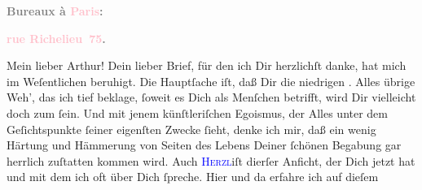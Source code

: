            \pstart
           \begin{otherlanguage}{french}\textcolor{gray}{\textbf{\textbf{Bureaux à \textcolor{pink}{Paris}{}\ledrightnote{\textcolor{pink}{Paris}}:}}}\end{otherlanguage}\pend
           \pstart
           \begin{otherlanguage}{french}\textcolor{gray}{\textbf{\textbf{\textcolor{pink}{rue Richelieu 75}{}\ledrightnote{\textcolor{pink}{rue Richelieu}}.}}}\end{otherlanguage}\pend
           \pstart
           Mein lieber Arthur!\pend
           \pstart
           Dein lieber Brief, für den ich Dir herzlichſt danke, hat mich im Weſentlichen
               beruhigt. Die Hauptſache iſt, daß Dir die niedrigen \label{K_L02708-1v}\label{K_L02708-1h}. Alles übrige Weh’, das ich tief
               beklage, ſoweit es Dich als Menſchen betrifft, wird Dir vielleicht doch zum \label{T_L02708-1v}\label{T_L02708-1h} ſein. Und mit jenem künſtleriſchen Egoismus, der
               Alles unter dem Geſichtspunkte ſeiner eigenſten Zwecke ſieht, denke ich mir, daß ein
               wenig Härtung und Hämmerung von Seiten des Lebens Deiner ſchönen Begabung gar
               herrlich zuſtatten kommen wird. Auch \textsc{\textcolor{blue}{Herzl}{}\ledrightnote{\textcolor{blue}{Theodor Herzl}}{ }}{\pb}iſt dierſer Anficht, der Dich jetzt \label{K_L02708-2v}\label{K_L02708-2h} hat und mit dem ich oft über Dich ſpreche. Hier und da erfahre ich auf dieſem
